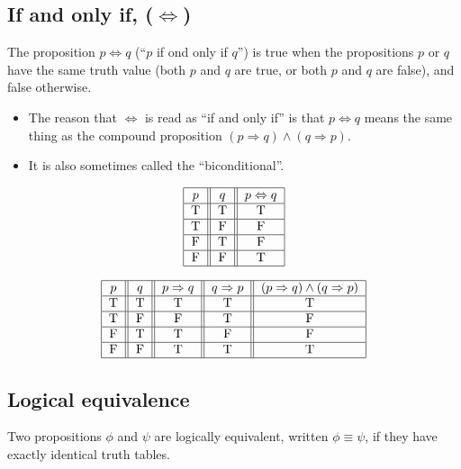 \documentclass[12pt,a4paper]{article}
\begin{document}
\vspace{10pt}
 \subsection{If and only if, (\(\Leftrightarrow \))} 
The proposition \(p \Leftrightarrow q\) (``\(p\) if ond only if \(q\)'') is true when the propositions \(p\) or \(q\) have the same truth value (both \(p\) and \(q\) are true, or both \(p\) and \(q\) are false), and false otherwise.
\begin{itemize}
    \item The reason that \(\Leftrightarrow \) is read as ``if and only if'' is that \(p \Leftrightarrow q\) means the same thing as the compound proposition \((p \Rightarrow q) \wedge(q \Rightarrow p)\).
    \item It is also sometimes called the ``biconditional''. 
\end{itemize}

 \begin{align*}
    \begin{tabular}{|c||c||c|}
        \hline \(p\) & \(q\) & \(p \Leftrightarrow q\) \\
        \hline T & T & T \\
        \hline T & F & F \\
        \hline F & T & F \\
        \hline F & F & T \\
        \hline
        \end{tabular} 
\end{align*}

\begin{align*}
    \begin{tabular}{|c||c||c||c||c|}
       \hline \(p\)  & \(q\)   & \(p \Rightarrow q\) & \( q \Rightarrow p \)   & \( ( p \Rightarrow q ) \wedge (q \Rightarrow p )\) \\
    \hline T & T & T & T & T \\
    \hline T & F & F & T & F \\
    \hline F & T & T & F & F \\
    \hline F & F & T & T & T \\
    \hline
    \end{tabular}
\end{align*}

 \subsection{Logical equivalence}    
Two propositions \(\phi \) and \(\psi \) are logically equivalent, written \(\phi \equiv \psi \), if they have exactly identical truth tables.
\end{document}
